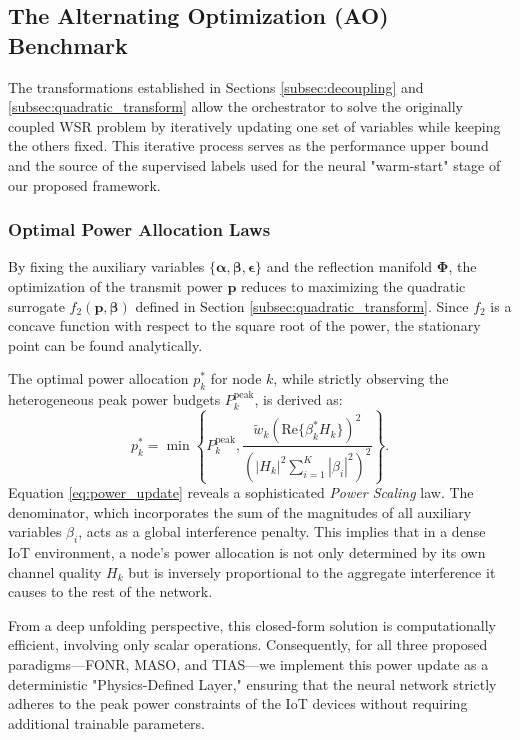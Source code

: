 \documentclass[journal]{IEEEtran}
\begin{document}
\subsection{The Alternating Optimization (AO) Benchmark}
\label{subsec:ao_benchmark}

The transformations established in Sections \ref{subsec:decoupling} and \ref{subsec:quadratic_transform} allow the orchestrator to solve the originally coupled WSR problem by iteratively updating one set of variables while keeping the others fixed. This iterative process serves as the performance upper bound and the source of the supervised labels used for the neural "warm-start" stage of our proposed framework.

\subsubsection{Optimal Power Allocation Laws}
\label{subsubsec:power_laws}

By fixing the auxiliary variables $\{\boldsymbol{\alpha}, \boldsymbol{\beta}, \boldsymbol{\epsilon}\}$ and the reflection manifold $\boldsymbol{\Phi}$, the optimization of the transmit power $\mathbf{p}$ reduces to maximizing the quadratic surrogate $f_2(\mathbf{p}, \boldsymbol{\beta})$ defined in Section \ref{subsec:quadratic_transform}. Since $f_2$ is a concave function with respect to the square root of the power, the stationary point can be found analytically.

The optimal power allocation $p_k^*$ for node $k$, while strictly observing the heterogeneous peak power budgets $P_k^{\text{peak}}$, is derived as:
\begin{equation}
    p_k^* = \min \left\{ P_k^{\text{peak}}, \frac{\tilde{w}_k \left( \text{Re} \{ \beta_k^* H_k \} \right)^2}{\left( |H_k|^2 \sum_{i=1}^K |\beta_i|^2 \right)^2} \right\}.
    \label{eq:power_update}
\end{equation}
Equation \eqref{eq:power_update} reveals a sophisticated \textit{Power Scaling} law. The denominator, which incorporates the sum of the magnitudes of all auxiliary variables $\beta_i$, acts as a global interference penalty. This implies that in a dense IoT environment, a node’s power allocation is not only determined by its own channel quality $H_k$ but is inversely proportional to the aggregate interference it causes to the rest of the network.

From a deep unfolding perspective, this closed-form solution is computationally efficient, involving only scalar operations. Consequently, for all three proposed paradigms—FONR, MASO, and TIAS—we implement this power update as a deterministic "Physics-Defined Layer," ensuring that the neural network strictly adheres to the peak power constraints of the IoT devices without requiring additional trainable parameters.
\end{document}
